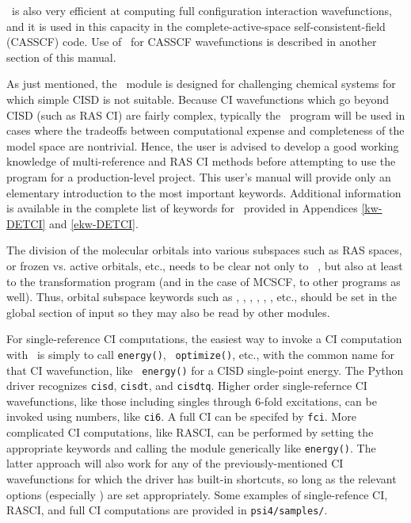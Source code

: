 \PSIdetci\ is also very efficient at computing full configuration interaction
wavefunctions, and it is used in this capacity in the complete-active-space
self-consistent-field (CASSCF) code.  Use of \PSIdetci\ for CASSCF
wavefunctions is described in another section of this manual.

As just mentioned, the \PSIdetci\ module is designed for challenging 
chemical systems for which simple CISD is not suitable.  Because
CI wavefunctions which go beyond CISD (such as RAS CI) are fairly complex,
typically the \PSIdetci\ program will be used in cases where the 
tradeoffs between computational expense and completeness of the 
model space are nontrivial.  Hence, the user is advised to develop
a good working knowledge of multi-reference and RAS CI methods before
attempting to use the program for a production-level project.  This user's
manual will provide only an elementary introduction to the most
important keywords.  Additional information is available in the complete
list of keywords for \PSIdetci\ provided in Appendices \ref{kw-DETCI} and \ref{ekw-DETCI}.

The division of the molecular orbitals into various subspaces such as
RAS spaces, or frozen vs. active orbitals, etc., needs to be clear not
only to \PSIdetci\ , but also at least to the transformation program
(and in the case of MCSCF, to other programs as well).  Thus, orbital
subspace keywords such as , , , 
, , , etc., should be set
in the global section of input so they may also be read by other modules.

For single-reference CI computations, the easiest way to invoke a CI
computation with \PSIdetci\ is simply to call {\tt energy()}, {\tt
optimize()}, etc., with the common name for that CI wavefunction, like {\tt
energy(\qq)} for a CISD single-point energy.  The Python driver
recognizes {\tt cisd}, {\tt cisdt}, and {\tt cisdtq}.  Higher order
single-refernce CI wavefunctions, like those including singles through
6-fold excitations, can be invoked using numbers, like {\tt ci6}.  A full
CI can be specifed by {\tt fci}.  More complicated CI computations, like
RASCI, can be performed by setting the appropriate keywords and calling the
module generically like {\tt energy(\qq)}.  The latter approach
will also work for any of the previously-mentioned CI wavefunctions for
which the driver has built-in shortcuts, so long as the relevant options
(especially ) are set appropriately.  Some
examples of single-refence CI, RASCI, and full CI computations are provided
in {\tt psi4/samples/}.


